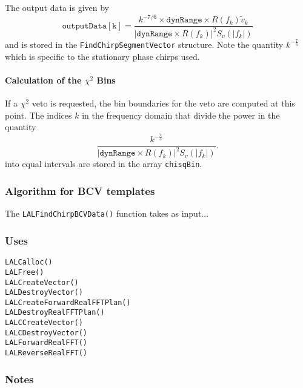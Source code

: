 The output data is given by
\begin{equation}
\mathtt{outputData[k]} = 
\frac{k^{-7/6} \times \mathtt{dynRange} \times R(f_k)\tilde{v}_k}
{\left|\mathtt{dynRange} \times R(f_k)\right|^2 S_v(|f_k|)}
\end{equation}
and is stored in the \texttt{FindChirpSegmentVector} structure. Note the
quantity $k^{-\frac{7}{6}}$ which is specific to the stationary phase chirps
used.

\paragraph*{Calculation of the $\chi^2$ Bins}

If a $\chi^2$ veto is requested, the bin boundaries for the veto are computed
at this point. The indices $k$ in the frequency domain that divide the power
in the quantity
\begin{equation}
\frac{k^{-\frac{7}{3}}}
{\left|\mathtt{dynRange}\times R(f_k)\right|^2 S_v(|f_k|)}.
\end{equation}
into equal intervals are stored in the array \texttt{chisqBin}.

\subsubsection*{Algorithm for BCV templates}

The \texttt{LALFindChirpBCVData()} function takes as input...

\subsubsection*{Uses}
\begin{verbatim}
LALCalloc()
LALFree()
LALCreateVector()
LALDestroyVector()
LALCreateForwardRealFFTPlan()
LALDestroyRealFFTPlan()
LALCCreateVector()
LALCDestroyVector()
LALForwardRealFFT()
LALReverseRealFFT()
\end{verbatim}

\subsubsection*{Notes}

